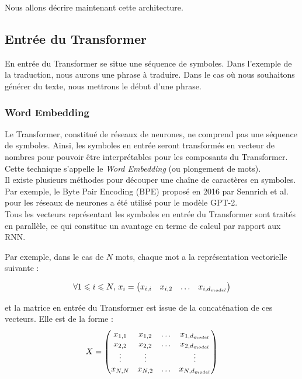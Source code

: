 Nous allons décrire maintenant cette architecture.

\subsection{Entrée du Transformer}

En entrée du Transformer se situe une séquence de symboles. Dans l'exemple de la traduction, nous aurons une phrase à traduire.
Dans le cas où nous souhaitons générer du texte, nous mettrons le début d'une phrase.

\subsubsection{Word Embedding}

Le Transformer, constitué de réseaux de neurones, ne comprend pas une séquence de symboles. Ainsi, les symboles en entrée seront transformés en vecteur
de nombres pour pouvoir être interprétables pour les composants du Transformer. Cette technique s'appelle le \textit{Word Embedding} (ou plongement de mots). \\

Il existe plusieurs méthodes pour découper une chaîne de caractères en symboles.
Par exemple, le Byte Pair Encoding (BPE)\cite{sennrich2016bpe} proposé en 2016 par Sennrich et al. pour
les réseaux de neurones a été utilisé pour le modèle GPT-2\cite{radford2019gpt2}. \\


Tous les vecteurs représentant les symboles en entrée du Transformer sont traités en parallèle,
ce qui constitue un avantage en terme de calcul par rapport aux RNN.

Par exemple, dans le cas de $N$ mots,
chaque mot a la représentation vectorielle suivante :

\[ \forall 1 \leqslant i \leqslant N , \, x_i =
\begin{pmatrix}
  x_{i,i} & x_{i,2} & \ldots & x_{i,d_{model}}
\end{pmatrix}
 \]

\noindent{}et la matrice en entrée du Transformer est issue de la concaténation de ces vecteurs. Elle est de la forme :
\[ X =
\begin{pmatrix}
  x_{1,1} & x_{1,2} & \ldots & x_{1,d_{model}} \\
  x_{2,2} & x_{2,2} & \ldots & x_{2,d_{model}} \\
  \vdots  & \vdots  &        & \vdots \\
  x_{N,N} & x_{N,2} & \ldots & x_{N,d_{model}}
\end{pmatrix}
\]

